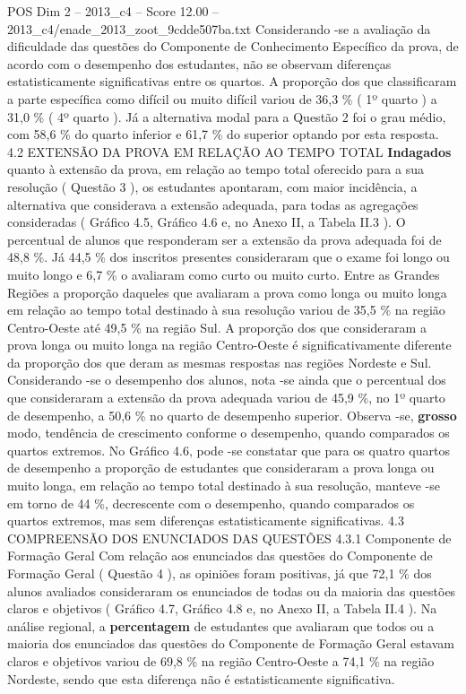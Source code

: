 \begin{textsample}{POS Dim 2 – 2013\_c4 – Score 12.00 – 2013\_c4/enade\_2013\_zoot\_9cdde507ba.txt}
Considerando -se a avaliação da dificuldade das questões do Componente de Conhecimento Específico da prova, de acordo com o desempenho dos estudantes, não se observam diferenças estatisticamente significativas entre os quartos.
A proporção dos que classificaram a parte específica como difícil ou muito difícil variou de 36,3 \% ( 1º quarto ) a 31,0 \% ( 4º quarto ).
Já a alternativa modal para a Questão 2 foi o grau médio, com 58,6 \% do quarto inferior e 61,7 \% do superior optando por esta resposta. 4.2 EXTENSÃO DA PROVA EM RELAÇÃO AO TEMPO TOTAL \textbf{Indagados} quanto à extensão da prova, em relação ao tempo total oferecido para a sua resolução ( Questão 3 ), os estudantes apontaram, com maior incidência, a alternativa que considerava a extensão adequada, para todas as agregações consideradas ( Gráfico 4.5, Gráfico 4.6 e, no Anexo II, a Tabela II.3 ).
O percentual de alunos que responderam ser a extensão da prova adequada foi de 48,8 \%.
Já 44,5 \% dos inscritos presentes consideraram que o exame foi longo ou muito longo e 6,7 \% o avaliaram como curto ou muito curto.
Entre as Grandes Regiões a proporção daqueles que avaliaram a prova como longa ou muito longa em relação ao tempo total destinado à sua resolução variou de 35,5 \% na região Centro-Oeste até 49,5 \% na região Sul.
A proporção dos que consideraram a prova longa ou muito longa na região Centro-Oeste é significativamente diferente da proporção dos que deram as mesmas respostas nas regiões Nordeste e Sul.
Considerando -se o desempenho dos alunos, nota -se ainda que o percentual dos que consideraram a extensão da prova adequada variou de 45,9 \%, no 1º quarto de desempenho, a 50,6 \% no quarto de desempenho superior.
Observa -se, \textbf{grosso} modo, tendência de crescimento conforme o desempenho, quando comparados os quartos extremos.
No Gráfico 4.6, pode -se constatar que para os quatro quartos de desempenho a proporção de estudantes que consideraram a prova longa ou muito longa, em relação ao tempo total destinado à sua resolução, manteve -se em torno de 44 \%, decrescente com o desempenho, quando comparados os quartos extremos, mas sem diferenças estatisticamente significativas. 4.3 COMPREENSÃO DOS ENUNCIADOS DAS QUESTÕES 4.3.1 Componente de Formação Geral Com relação aos enunciados das questões do Componente de Formação Geral ( Questão 4 ), as opiniões foram positivas, já que 72,1 \% dos alunos avaliados consideraram os enunciados de todas ou da maioria das questões claros e objetivos ( Gráfico 4.7, Gráfico 4.8 e, no Anexo II, a Tabela II.4 ).
Na análise regional, a \textbf{percentagem} de estudantes que avaliaram que todos ou a maioria dos enunciados das questões do Componente de Formação Geral estavam claros e objetivos variou de 69,8 \% na região Centro-Oeste a 74,1 \% na região Nordeste, sendo que esta diferença não é estatisticamente significativa.

\end{textsample}
